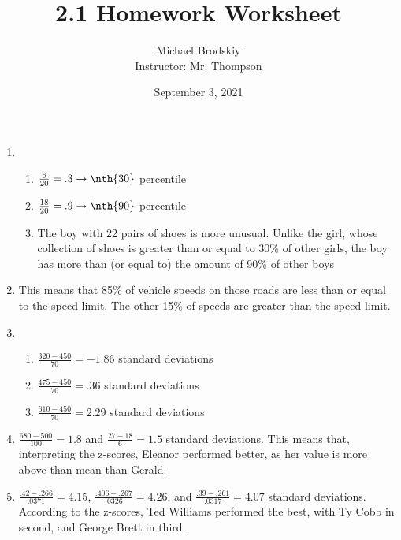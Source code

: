 \documentclass[12pt]{article}
\title{2.1 Homework Worksheet}
\date{September 3, 2021}
\author{Michael Brodskiy\\ \small Instructor: Mr. Thompson}
\begin{document}
\maketitle

\begin{enumerate}

  \item

    \begin{enumerate}

      \item $\frac{6}{20}=.3\rightarrow \nth{30}$ percentile

      \item $\frac{18}{20}=.9\rightarrow\nth{90}$ percentile

      \item The boy with 22 pairs of shoes is more unusual. Unlike the girl, whose collection of shoes is greater than or equal to 30\% of other girls, the boy has more than (or equal to) the amount of 90\% of other boys

    \end{enumerate}

  \item This means that 85\% of vehicle speeds on those roads are less than or equal to the speed limit. The other 15\% of speeds are greater than the speed limit.

  \item

    \begin{enumerate}

      \item $\frac{320-450}{70}=-1.86$ standard deviations

      \item $\frac{475-450}{70}=.36$ standard deviations

      \item $\frac{610-450}{70}=2.29$ standard deviations

    \end{enumerate}

  \item $\frac{680-500}{100}=1.8$ and $\frac{27-18}{6}=1.5$ standard deviations. This means that, interpreting the z-scores, Eleanor performed better, as her value is more above than mean than Gerald.

  \item $\frac{.42-.266}{.0371}=4.15$, $\frac{.406-.267}{.0326}=4.26$, and $\frac{.39-.261}{.0317}=4.07$ standard deviations. According to the z-scores, Ted Williams performed the best, with Ty Cobb in second, and George Brett in third.


\end{enumerate}
\end{document}
